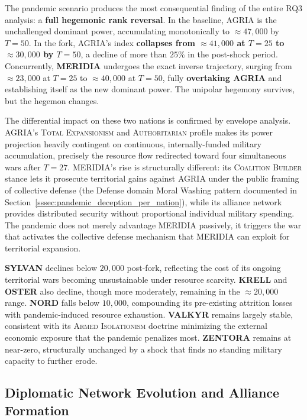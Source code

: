 The pandemic scenario produces the most consequential finding of the entire RQ3 analysis: a \textbf{full hegemonic rank reversal}. In the baseline, AGRIA is the unchallenged dominant power, accumulating monotonically to $\approx\!47{,}000$ by $T=50$. In the fork, AGRIA's index \textbf{collapses from $\approx\!41{,}000$ at $T=25$ to $\approx\!30{,}000$ by $T=50$}, a decline of more than $25\%$ in the post-shock period. Concurrently, \textbf{MERIDIA} undergoes the exact inverse trajectory, surging from $\approx\!23{,}000$ at $T=25$ to $\approx\!40{,}000$ at $T=50$, fully \textbf{overtaking AGRIA} and establishing itself as the new dominant power. The unipolar hegemony survives, but the hegemon changes.

The differential impact on these two nations is confirmed by envelope analysis. AGRIA's \textsc{Total Expansionism} and \textsc{Authoritarian} profile makes its power projection heavily contingent on continuous, internally-funded military accumulation, precisely the resource flow redirected toward four simultaneous wars after $T=27$. MERIDIA's rise is structurally different: its \textsc{Coalition Builder} stance lets it prosecute territorial gains against AGRIA under the public framing of collective defense (the Defense domain Moral Washing pattern documented in Section~\ref{sssec:pandemic_deception_per_nation}), while its alliance network provides distributed security without proportional individual military spending. The pandemic does not merely advantage MERIDIA passively, it triggers the war that activates the collective defense mechanism that MERIDIA can exploit for territorial expansion.

\textbf{SYLVAN} declines below $20{,}000$ post-fork, reflecting the cost of its ongoing territorial wars becoming unsustainable under resource scarcity. \textbf{KRELL} and \textbf{OSTER} also decline, though more moderately, remaining in the $\approx\!20{,}000$ range. \textbf{NORD} falls below $10{,}000$, compounding its pre-existing attrition losses with pandemic-induced resource exhaustion. \textbf{VALKYR} remains largely stable, consistent with its \textsc{Armed Isolationism} doctrine minimizing the external economic exposure that the pandemic penalizes most. \textbf{ZENTORA} remains at near-zero, structurally unchanged by a shock that finds no standing military capacity to further erode.


\subsection{Diplomatic Network Evolution and Alliance Formation}

